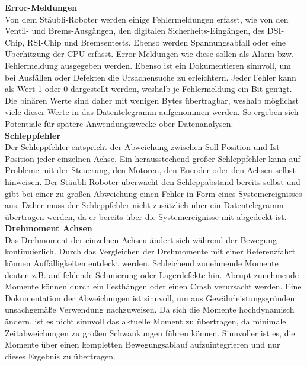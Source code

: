 \documentclass[ a4paper,
                oneside,
                toc=bibliography,
                toc=listof
                ]{scrbook}
\begin{document}
 	\textbf{Error-Meldungen}\\
 	Von dem Stäubli-Roboter werden einige Fehlermeldungen erfasst, wie von den Ventil- und Brems-Ausgängen, den digitalen Sicherheits-Eingängen, des DSI-Chip, RSI-Chip und Bremsentests. Ebenso werden Spannungsabfall oder eine Überhitzung der CPU erfasst. Error-Meldungen wie diese sollen als Alarm bzw. Fehlermeldung ausgegeben werden. Ebenso ist ein Dokumentieren sinnvoll, um bei Ausfällen oder Defekten die Ursachensuche zu erleichtern. Jeder Fehler kann als Wert 1 oder 0 dargestellt werden, weshalb je Fehlermeldung ein Bit genügt. Die binären Werte sind daher mit wenigen Bytes übertragbar, weshalb möglichst viele dieser Werte in das Datentelegramm aufgenommen werden. So ergeben sich Potentiale für spätere Anwendungszwecke ober Datenanalysen.\vspace{0.5\baselineskip}\\
 	\textbf{Schleppfehler}\\
 	Der Schleppfehler entspricht der Abweichung zwischen Soll-Position und Ist-Position jeder einzelnen Achse. Ein herausstechend großer Schleppfehler kann auf Probleme mit der Steuerung, den Motoren, den Encoder oder den Achsen selbst hinweisen. Der Stäubli-Roboter überwacht den Schleppabstand bereits selbst und gibt bei einer zu großen Abweichung einen Fehler in Form eines Systemereignisses aus. Daher muss der Schleppfehler nicht zusätzlich über ein Datentelegramm übertragen werden, da er bereits über die Systemereignisse mit abgedeckt ist.\vspace{0.5\baselineskip}\\
 	\textbf{Drehmoment Achsen}\\
 	Das Drehmoment der einzelnen Achsen ändert sich während der Bewegung kontinuierlich. Durch das Vergleichen der Drehmomente mit einer Referenzfahrt können  Auffälligkeiten entdeckt werden. Schleichend zunehmende Momente deuten z.B. auf fehlende Schmierung oder Lagerdefekte hin. Abrupt zunehmende Momente können durch ein Festhängen oder einen Crash verursacht werden. Eine Dokumentation der Abweichungen ist sinnvoll, um aus Gewährleistungsgründen unsachgemäße Verwendung nachzuweisen. Da sich die Momente hochdynamisch ändern, ist es nicht sinnvoll das aktuelle Moment zu übertragen, da minimale Zeitabweichungen zu großen Schwankungen führen können. Sinnvoller ist es, die Momente über einen kompletten Bewegungsablauf aufzuintegrieren und nur dieses Ergebnis zu übertragen.\vspace{0.5\baselineskip}\\
\end{document}
